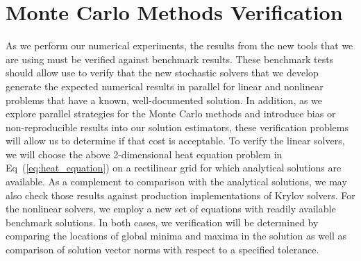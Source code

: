 \section{Monte Carlo Methods Verification}
\label{sec:method_verification}
As we perform our numerical experiments, the results from the new
tools that we are using must be verified against benchmark
results. These benchmark tests should allow use to verify that the new
stochastic solvers that we develop generate the expected numerical
results in parallel for linear and nonlinear problems that have a
known, well-documented solution. In addition, as we explore parallel
strategies for the Monte Carlo methods and introduce bias or
non-reproducible results into our solution estimators, these
verification problems will allow us to determine if that cost is
acceptable. To verify the linear solvers, we will choose the above
2-dimensional heat equation problem in Eq~(\ref{eq:heat_equation}) on
a rectilinear grid for which analytical solutions are available. As a
complement to comparison with the analytical solutions, we may also
check those results against production implementations of Krylov
solvers. For the nonlinear solvers, we employ a new set of equations
with readily available benchmark solutions. In both cases, we
verification will be determined by comparing the locations of global
minima and maxima in the solution as well as comparison of solution
vector norms with respect to a specified tolerance.

